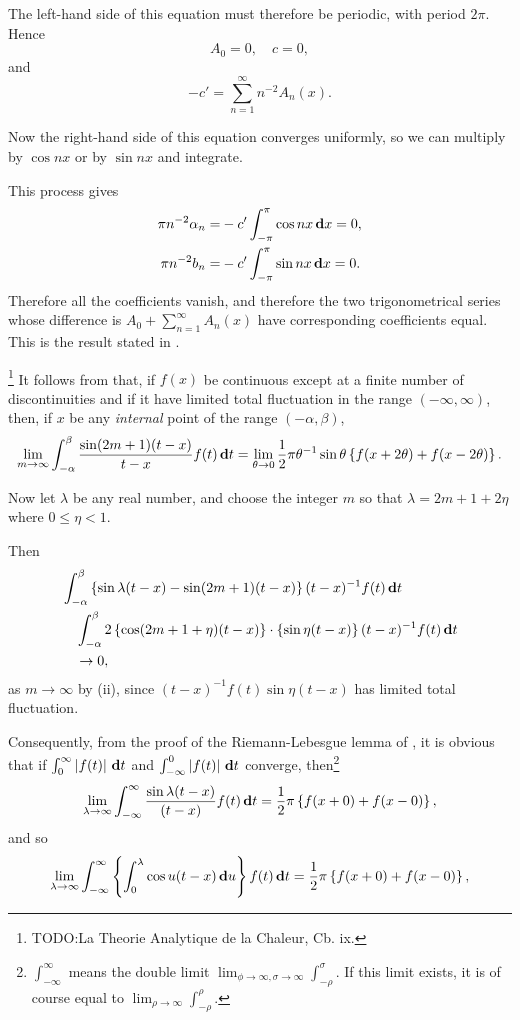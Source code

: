 The left-hand side of this equation must therefore be periodic, with
period $2\pi$. Hence
$$
A_{0} = 0,
\quad
c = 0,
$$
and
$$
-c' = \sum_{n=1}^{\infty} n^{-2} A_{n}(x).
$$

Now the right-hand side of this equation converges uniformly, so we
can multiply by $\cos nx$ or by $\sin nx$ and integrate.

This process gives
\begin{align*}
  \pi n^{-2} \alpha_{n}
  =&
  - c' \int_{-\pi}^{\pi} \cos nx \, \mathbf{d} x = 0,
  \\
  \pi n^{-2} b_{n}
  =&
  - c' \int_{-\pi}^{\pi} \sin nx \, \mathbf{d} x = 0.
\end{align*}
%
%
Therefore all the coefficients vanish, and therefore the two
trigonometrical series whose difference is
$A_{0} + \sum_{n=1}^{\infty} A_{n}(x)$ have
corresponding coefficients equal.
This is the result stated in .

\footnote{TODO:La Theorie Analytique de la Chaleur, Cb. ix.}
It follows from  that, if $f(x)$ be continuous except at a
finite number of discontinuities and if it have limited total
fluctuation in the range $(-\infty, \infty)$, then, if $x$ be any
\emph{internal} point of the range $(-\alpha, \beta)$,
$$
\lim_{m \rightarrow \infty}
\int_{-\alpha}^{\beta}
\frac{\sin (2m + 1)(t - x)}{t - x}
f(t) \, \mathbf{d} t
=
\lim_{\theta \rightarrow 0}
\frac{1}{2} \pi \theta^{-1} \sin \theta
\left\{ 
  f(x + 2\theta) + f(x - 2 \theta)
 \right\}.
$$

Now let $\lambda$ be any real number, and choose the integer $m$ so that
$\lambda = 2m + 1 + 2\eta$ where $0 \leq \eta < 1$.

Then
\begin{align*}
  &
  \int_{-\alpha}^{\beta}
  \left\{ 
    \sin \lambda(t - x) - \sin (2m+1)(t-x)
   \right\}
  (t - x)^{-1} f(t) \, \mathbf{d} t
  \\
  &\quad
  \int_{-\alpha}^{\beta}
  2 \left\{ 
    \cos (2m + 1 + \eta)(t-x)
   \right\} \cdot \left\{ 
    \sin \eta (t-x)
   \right\}
  (t - x)^{-1} f(t) \, \mathbf{d} t
  \\
  &\quad
  \rightarrow 0,
\end{align*}
as $m \rightarrow \infty$ by
 (ii), %
since $(t - x)^{-1} f(t) \sin \eta(t - x)$ has
limited total fluctuation.

Consequently, from the proof of the Riemann-Lebesgue lemma of ,
it is obvious that if $\int_{0}^{\infty} \left| f(t) \right| \, \mathbf{d} t$ and
$\int_{-\infty}^{0} \left| f(t) \right| \, \mathbf{d} t$ converge, then\footnote{$\int_{-\infty}^{\infty}$ means the double limit
  $\lim_{\phi\rightarrow\infty, \sigma\rightarrow\infty} \int_{-\rho}^{\sigma}$. If this limit exists, it is of course
  equal to $\lim_{\rho\rightarrow\infty}\int_{-\rho}^{\rho}$.}
$$
\lim_{\lambda\rightarrow\infty}
\int_{-\infty}^{\infty}
\frac{\sin \lambda(t-x)}{(t-x)}
f(t) \, \mathbf{d} t
=
\frac{1}{2}
\pi
\left\{ 
  f(x+0) + f(x-0)
 \right\},
$$
and so
$$
\lim_{\lambda\rightarrow\infty}
\int_{-\infty}^{\infty}
\left\{ 
  \int_{0}^{\lambda}
  \cos u(t-x) \, \mathbf{d} u
 \right\}
f(t) \, \mathbf{d} t
=
\frac{1}{2}
\pi
\left\{ 
  f(x+0) + f(x-0)
 \right\},
$$


